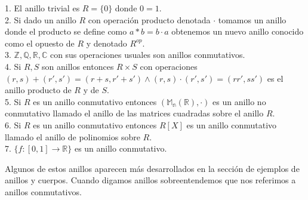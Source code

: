 \begin{example}
	1. El anillo trivial es $R = \{0\}$ donde $0 = 1$. \\
	2. Si dado un anillo $R$ con operación producto denotada $\cdot$ tomamos un anillo donde el producto se define como $a*b = b\cdot a$ obtenemos un nuevo anillo conocido como el opuesto de $R$ y denotado $R^{op}$.\\	
	3. $\mathbb{Z},\mathbb{Q},\mathbb{R},\mathbb{C}$ con sus operaciones usuales son anillos conmutativos. \\
	4. Si $R,S$ son anillos entonces $R \times S$ con operaciones $(r,s) + (r',s') = (r+s,r'+s') \land (r,s) \cdot (r',s') = (rr',ss')$ es el anillo producto de $R$ y de $S$.\\
	5. Si $R$ es un anillo conmutativo entonces $(\mathbb{M_n(R)},\cdot)$ es un anillo no conmutativo llamado el anillo de las matrices cuadradas sobre el anillo $R$. \\
	6. Si $R$ es un anillo conmutativo entonces $R[X]$ es un anillo conmutativo llamado el anillo de polinomios sobre $R$.  \\
	7. $\{f:[0,1] \to \mathbb{R}\}$ es un anillo conmutativo. 
\end{example}

Algunos de estos anillos aparecen más desarrollados en la sección de ejemplos de anillos y cuerpos. Cuando digamos anillos sobreentendemos que nos referimos a anillos conmutativos.

